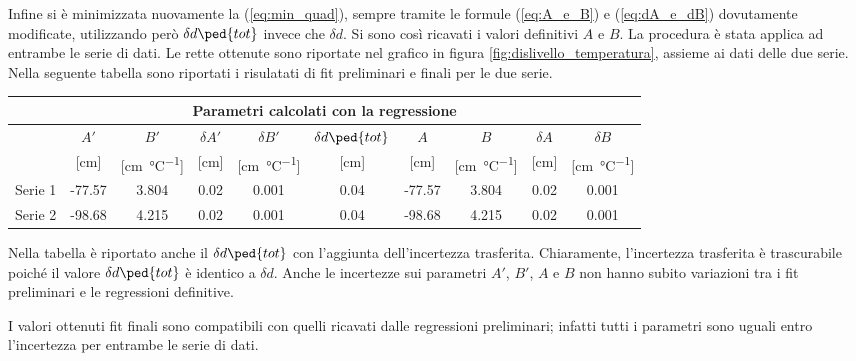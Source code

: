 Infine si è minimizzata nuovamente la (\ref{eq:min_quad}), sempre tramite le formule (\ref{eq:A_e_B}) e (\ref{eq:dA_e_dB})
dovutamente modificate, utilizzando però $\delta d\ped{tot}$ invece che $\delta d$.
%
Si sono così ricavati i valori definitivi $A$ e $B$. La procedura è stata applica ad entrambe le serie di dati.
Le rette ottenute sono riportate nel grafico in figura \ref{fig:dislivello_temperatura}, assieme ai dati delle due serie.
Nella seguente tabella sono riportati i risulatati di fit preliminari e finali per le due serie.

\begin{center}
    \small
    \begin{tabular}{l c c c c c | c c c c}
        \multicolumn{10}{c}{\textbf{Parametri calcolati con la regressione}} \\
        \toprule
        & $A'$ & $B'$ & $\delta A'$ & $\delta B'$ &
        $\delta d\ped{tot}$ & $A$ & $B$ & $\delta A$ & $\delta B$ \\
        & [cm] & [\si{\centi\meter\per\celsius}] &  [cm] & [\si{\centi\meter\per\celsius}] &
        [cm] & [cm] & [\si{\centi\meter\per\celsius}] & [cm] & [\si{\centi\meter\per\celsius}] \\
        \midrule
        Serie 1 & -77.57 & 3.804 & 0.02 & 0.001 & 0.04 & -77.57 & 3.804 & 0.02 & 0.001 \\
        Serie 2  & -98.68 & 4.215 & 0.02 & 0.001 & 0.04 & -98.68 & 4.215 & 0.02 & 0.001 \\
        \bottomrule
    \end{tabular}
\end{center}

Nella tabella è riportato anche il $\delta d\ped{tot}$ con l'aggiunta dell'incertezza trasferita. Chiaramente, l'incertezza trasferita è
trascurabile poiché il valore $\delta d\ped{tot}$ è identico a $\delta d$. Anche le incertezze sui parametri $A'$, $B'$, $A$ e $B$
non hanno subito variazioni tra i fit preliminari e le regressioni definitive.

I valori ottenuti fit finali sono compatibili con quelli ricavati dalle regressioni preliminari; infatti tutti i parametri
sono uguali entro l'incertezza per entrambe le serie di dati.
